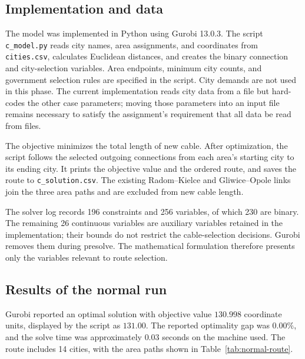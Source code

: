 \documentclass[11pt,a4paper]{article}
\begin{document}
\subsection{Implementation and data}
The model was implemented in Python using Gurobi 13.0.3. The script \texttt{c\_model.py} reads city names, area assignments, and coordinates from \texttt{cities.csv}, calculates Euclidean distances, and creates the binary connection and city-selection variables. Area endpoints, minimum city counts, and government selection rules are specified in the script. City demands are not used in this phase. The current implementation reads city data from a file but hard-codes the other case parameters; moving those parameters into an input file remains necessary to satisfy the assignment's requirement that all data be read from files.

The objective minimizes the total length of new cable. After optimization, the script follows the selected outgoing connections from each area's starting city to its ending city. It prints the objective value and the ordered route, and saves the route to \texttt{c\_solution.csv}. The existing Radom--Kielce and Gliwice--Opole links join the three area paths and are excluded from new cable length.

The solver log records 196 constraints and 256 variables, of which 230 are binary. The remaining 26 continuous variables are auxiliary variables retained in the implementation; their bounds do not restrict the cable-selection decisions. Gurobi removes them during presolve. The mathematical formulation therefore presents only the variables relevant to route selection.

\subsection{Results of the normal run}
Gurobi reported an optimal solution with objective value $130.998$ coordinate units, displayed by the script as $131.00$. The reported optimality gap was $0.00\%$, and the solve time was approximately $0.03$ seconds on the machine used. The route includes 14 cities, with the area paths shown in Table~\ref{tab:normal-route}.
\end{document}
